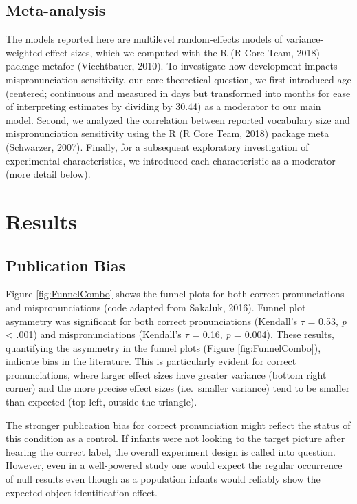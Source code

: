 \documentclass[man]{apa6}
\theoremstyle{definition}
\theoremstyle{definition}
\theoremstyle{definition}
\theoremstyle{remark}
\begin{document}
\subsection{Meta-analysis}\label{meta-analysis}

The models reported here are multilevel random-effects models of
variance-weighted effect sizes, which we computed with the R (R Core
Team, 2018) package metafor (Viechtbauer, 2010). To investigate how
development impacts mispronunciation sensitivity, our core theoretical
question, we first introduced age (centered; continuous and measured in
days but transformed into months for ease of interpreting estimates by
dividing by 30.44) as a moderator to our main model. Second, we analyzed
the correlation between reported vocabulary size and mispronunciation
sensitivity using the R (R Core Team, 2018) package meta (Schwarzer,
2007). Finally, for a subsequent exploratory investigation of
experimental characteristics, we introduced each characteristic as a
moderator (more detail below).

\section{Results}\label{results}

\subsection{Publication Bias}\label{publication-bias-1}

Figure \ref{fig:FunnelCombo} shows the funnel plots for both correct
pronunciations and mispronunciations (code adapted from Sakaluk, 2016).
Funnel plot asymmetry was significant for both correct pronunciations
(Kendall's \(\tau\) = 0.53, \emph{p} \textless{} .001) and
mispronunciations (Kendall's \(\tau\) = 0.16, \emph{p} = 0.004). These
results, quantifying the asymmetry in the funnel plots (Figure
\ref{fig:FunnelCombo}), indicate bias in the literature. This is
particularly evident for correct pronunciations, where larger effect
sizes have greater variance (bottom right corner) and the more precise
effect sizes (i.e.~smaller variance) tend to be smaller than expected
(top left, outside the triangle).

The stronger publication bias for correct pronunciation might reflect
the status of this condition as a control. If infants were not looking
to the target picture after hearing the correct label, the overall
experiment design is called into question. However, even in a
well-powered study one would expect the regular occurrence of null
results even though as a population infants would reliably show the
expected object identification effect.
\end{document}
